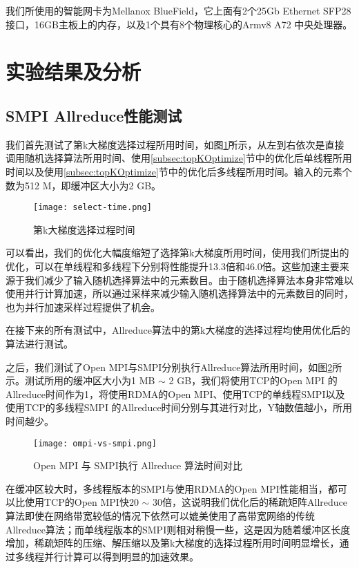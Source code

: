 我们所使用的智能网卡为Mellanox BlueField，它上面有2个25Gb Ethernet SFP28 接口，16GB主板上的内存，以及1个具有8个物理核心的Armv8 A72 中央处理器。

\section{实验结果及分析}
\subsection{SMPI Allreduce性能测试}

我们首先测试了第k大梯度选择过程所用时间，如图\ref{fig:select}所示，从左到右依次是直接调用随机选择算法所用时间、使用\ref{subsec:topKOptimize}节中的优化后单线程所用时间以及使用\ref{subsec:topKOptimize}节中的优化后多线程所用时间。输入的元素个数为512 M，即缓冲区大小为2 GB。

\begin{figure}[ht] %
    \centering
    \texttt{[image: select-time.png]}
    \caption{第k大梯度选择过程时间}
    \label{fig:select}
  \end{figure}

可以看出，我们的优化大幅度缩短了选择第k大梯度所用时间，使用我们所提出的优化，可以在单线程和多线程下分别将性能提升13.3倍和46.0倍。这些加速主要来源于我们减少了输入随机选择算法中的元素数目。由于随机选择算法本身非常难以使用并行计算加速，所以通过采样来减少输入随机选择算法中的元素数目的同时，也为并行加速采样过程提供了机会。

在接下来的所有测试中，Allreduce算法中的第k大梯度的选择过程均使用优化后的算法进行测试。

之后，我们测试了Open MPI与SMPI分别执行Allreduce算法所用时间，如图\ref{fig:ompi-vs-smpi}所示。测试所用的缓冲区大小为1 MB $\sim$ 2 GB，我们将使用TCP的Open MPI 的Allreduce时间作为1，将使用RDMA的Open MPI、使用TCP的单线程SMPI以及使用TCP的多线程SMPI 的Allreduce时间分别与其进行对比，Y轴数值越小，所用时间越少。

\begin{figure}[ht] %
    \centering
    \texttt{[image: ompi-vs-smpi.png]}
    \caption{Open MPI 与 SMPI执行 Allreduce 算法时间对比}
    \label{fig:ompi-vs-smpi}
  \end{figure}

在缓冲区较大时，多线程版本的SMPI与使用RDMA的Open MPI性能相当，都可以比使用TCP的Open MPI快20 $\sim$ 30倍，这说明我们优化后的稀疏矩阵Allreduce算法即使在网络带宽较低的情况下依然可以媲美使用了高带宽网络的传统Allreduce算法；而单线程版本的SMPI则相对稍慢一些，这是因为随着缓冲区长度增加，稀疏矩阵的压缩、解压缩以及第k大梯度的选择过程所用时间明显增长，通过多线程并行计算可以得到明显的加速效果。

